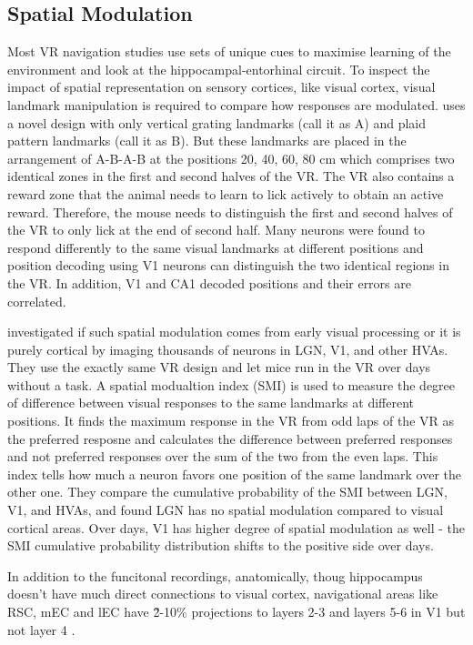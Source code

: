 \subsection{Spatial Modulation}
Most VR navigation studies use sets of unique cues to maximise learning of the environment and look at the hippocampal-entorhinal circuit. To inspect the impact of spatial representation on sensory cortices, like visual cortex, visual landmark manipulation is required to compare how responses are modulated. \cite{saleem_coherent_2018} uses a novel design with only vertical grating landmarks (call it as A) and plaid pattern landmarks (call it as B). But these landmarks are placed in the arrangement of A-B-A-B at the positions 20, 40, 60, 80 cm which comprises two identical zones in the first and second halves of the VR. The VR also contains a reward zone that the animal needs to learn to lick actively to obtain an active reward. Therefore, the mouse needs to distinguish the first and second halves of the VR to only lick at the end of second half. Many neurons were found to respond differently to the same visual landmarks at different positions and position decoding using V1 neurons can distinguish the two identical regions in the VR. In addition, V1 and CA1 decoded positions and their errors are correlated. 

\cite{mika_diamanti_spatial_2021} investigated if such spatial modulation comes from early visual processing or it is purely cortical by imaging thousands of neurons in LGN, V1, and other HVAs. They use the exactly same VR design and let mice run in the VR over days without a task. A spatial modualtion index (SMI) is used to measure the degree of difference between visual responses to the same landmarks at different positions. It finds the maximum response in the VR from odd laps of the VR as the preferred resposne and calculates the difference between preferred responses and not preferred responses over the sum of the two from the even laps. This index tells how much a neuron favors one position of the same landmark over the other one. They compare the cumulative probability of the SMI between LGN, V1, and HVAs, and found LGN has no spatial modulation compared to visual cortical areas. Over days, V1 has higher degree of spatial modulation as well - the SMI cumulative probability distribution shifts to the positive side over days.

In addition to the funcitonal recordings, anatomically, thoug hippocampus doesn't have much direct connections to visual cortex, navigational areas like RSC, mEC and lEC have \~ 2-10\% projections to layers 2-3 and layers 5-6 in V1 but not layer 4 \cite{yao_whole-brain_2023, morimoto_organization_2021}.

